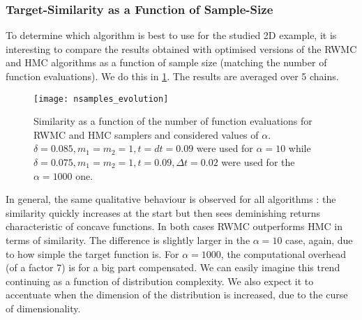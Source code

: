 \documentclass[a4paper, 12pt,oneside]{article}
\begin{document}
		\subsubsection{Target-Similarity as a Function of Sample-Size}\label{sec:target-similarity}
		To determine which algorithm is best to use for the studied 2D example, it is interesting to compare the results obtained with optimised versions of the RWMC and HMC algorithms as a function of sample size (matching the number of function evaluations). We do this in \ref{fig:nsamples-evolution}. The results are averaged over 5 chains.
		\begin{figure}[htb]
			\centering
				\vspace{0em}
				\texttt{[image: nsamples\_evolution]}
				\caption{Similarity as a function of the number of function evaluations for RWMC and HMC samplers and considered values of $\alpha$. $\delta=0.085,m_1=m_2=1,t=dt=0.09$ were used for $\alpha=10$ while $\delta=0.075,m_1=m_2=1,t=0.09,\Delta t=0.02$ were used for the $\alpha=1000$ one.}
				\label{fig:nsamples-evolution}
		\end{figure}
		In general, the same qualitative behaviour is observed for all algorithms : the similarity quickly increases at the start but then sees deminishing returns characteristic of concave functions. In both cases RWMC outperforms HMC in terms of similarity. 
		The difference is slightly larger in the $\alpha=10$ case, again, due to how simple the target function is. For $\alpha=1000$, the computational overhead (of a factor 7) is for a big part compensated. We can easily imagine this trend continuing as a function of distribution complexity. We also expect it to accentuate when the dimension of the distribution is increased, due to the curse of dimensionality. 
\end{document}
